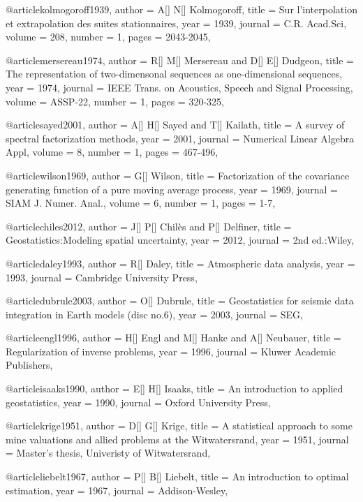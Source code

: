 @article{kolmogoroff1939,
  author =	 {A[] N[] Kolmogoroff},
  title =	 {Sur l'interpolation et extrapolation des suites stationnaires},
  year =	 1939,
  journal =	 {C.R. Acad.Sci},
  volume =	 208,
  number =	 1,
  pages =	 {2043-2045},
}

@article{mersereau1974,
  author =	 {R[] M[] Mersereau and D[] E[] Dudgeon},
  title =	 {The representation of two-dimensonal sequences as one-dimensional sequences},
  year =	 1974,
  journal =	 {IEEE Trans. on Acoustics, Speech and Signal Processing},
  volume =	 ASSP-22,
  number =	 1,
  pages =	 {320-325},
}

@article{sayed2001,
  author =	 {A[] H[] Sayed and T[] Kailath},
  title =	 {A survey of spectral factorization methods},
  year =	 2001,
  journal =	 {Numerical Linear Algebra Appl},
  volume =	 8,
  number =	 1,
  pages =	 {467-496},
}

@article{wilson1969,
  author =	 {G[] Wilson},
  title =	 {Factorization of the covariance generating function of a pure moving average process},
  year =	 1969,
  journal =	 {SIAM J. Numer. Anal.},
  volume =	 6,
  number =	 1,
  pages =	 {1-7},
}

@article{chiles2012,
  author =	 {J[] P[] Chil\`{e}s and P[] Delfiner},
  title =	 {Geostatistics:Modeling spatial uncertainty},
  year =	 2012,
  journal =	 {2nd ed.:Wiley},
}

@article{daley1993,
  author =	 {R[] Daley},
  title =	 {Atmospheric data analysis},
  year =	 1993,
  journal =	 {Cambridge University Press},
}

@article{dubrule2003,
  author =	 {O[] Dubrule},
  title =	 {Geostatistics for seismic data integration in Earth models (disc no.6)},
  year =	 2003,
  journal =	 {SEG},
}

@article{engl1996,
  author =	 {H[] Engl and M[] Hanke and A[] Neubauer},
  title =	 {Regularization of inverse problems},
  year =	 1996,
  journal =	 {Kluwer Academic Publishers},
}

@article{isaaks1990,
  author =	 {E[] H[] Isaaks},
  title =	 {An introduction to applied geostatistics},
  year =	 1990,
  journal =	 {Oxford University Press},
}

@article{krige1951,
  author =	 {D[] G[] Krige},
  title =	 {A statistical approach to some mine valuations and allied problems at the Witwatersrand},
  year =	 1951,
  journal =	 {Master's thesis, Univeristy of Witwatersrand},
}

@article{liebelt1967,
  author =	 {P[] B[] Liebelt},
  title =	 {An introduction to optimal estimation},
  year =	 1967,
  journal =	 {Addison-Wesley},
}

